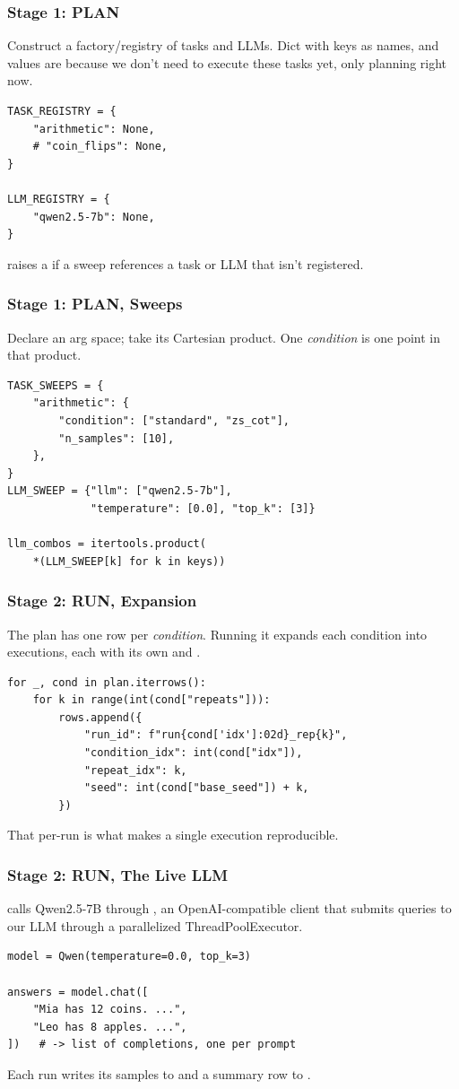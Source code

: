 \documentclass{beamer}
\begin{document}
\begin{frame}[fragile]
    \frametitle{Stage 1:  PLAN}
    Construct a factory/registry of tasks and LLMs.
    Dict with keys as names, and values are  because we don't need to execute these tasks yet, only planning right now.
    \begin{lstlisting}[style=demo]
TASK_REGISTRY = {
    "arithmetic": None,
    # "coin_flips": None,
}

LLM_REGISTRY = {
    "qwen2.5-7b": None,
}
    \end{lstlisting}
     raises a  if a sweep references
    a task or LLM that isn't registered.
\end{frame}

\begin{frame}[fragile]
    \frametitle{Stage 1: PLAN, Sweeps}
    Declare an arg space; take its Cartesian product. One \emph{condition} is
    one point in that product.
    \begin{lstlisting}[style=demo]
TASK_SWEEPS = {
    "arithmetic": {
        "condition": ["standard", "zs_cot"],
        "n_samples": [10],
    },
}
LLM_SWEEP = {"llm": ["qwen2.5-7b"],
             "temperature": [0.0], "top_k": [3]}

llm_combos = itertools.product(
    *(LLM_SWEEP[k] for k in keys))
    \end{lstlisting}
\end{frame}

\begin{frame}[fragile]
    \frametitle{Stage 2: RUN, Expansion}
    The plan has one row per \emph{condition}. Running it expands each
    condition into  executions, each with its own 
    and .
    \begin{lstlisting}[style=demo]
for _, cond in plan.iterrows():
    for k in range(int(cond["repeats"])):
        rows.append({
            "run_id": f"run{cond['idx']:02d}_rep{k}",
            "condition_idx": int(cond["idx"]),
            "repeat_idx": k,
            "seed": int(cond["base_seed"]) + k,
        })
    \end{lstlisting}
    That per-run  is what makes a single execution reproducible.
\end{frame}

\begin{frame}[fragile]
    \frametitle{Stage 2: RUN, The Live LLM}
     calls Qwen2.5-7B through ,  an
    OpenAI-compatible client that submits queries to our LLM through a parallelized ThreadPoolExecutor.
    \begin{lstlisting}[style=demo]
model = Qwen(temperature=0.0, top_k=3)

answers = model.chat([
    "Mia has 12 coins. ...",
    "Leo has 8 apples. ...",
])   # -> list of completions, one per prompt
    \end{lstlisting}
    Each run writes its samples to  and a summary
    row to .
\end{frame}
\end{document}
